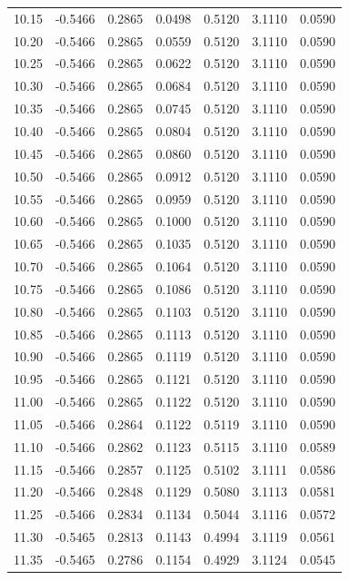\begin{longtable}{|c|c|c|c|c|c|c|}
10.15 & -0.5466 & 0.2865 & 0.0498 & 0.5120 & 3.1110 & 0.0590 \\
10.20 & -0.5466 & 0.2865 & 0.0559 & 0.5120 & 3.1110 & 0.0590 \\
10.25 & -0.5466 & 0.2865 & 0.0622 & 0.5120 & 3.1110 & 0.0590 \\
10.30 & -0.5466 & 0.2865 & 0.0684 & 0.5120 & 3.1110 & 0.0590 \\
10.35 & -0.5466 & 0.2865 & 0.0745 & 0.5120 & 3.1110 & 0.0590 \\
10.40 & -0.5466 & 0.2865 & 0.0804 & 0.5120 & 3.1110 & 0.0590 \\
10.45 & -0.5466 & 0.2865 & 0.0860 & 0.5120 & 3.1110 & 0.0590 \\
10.50 & -0.5466 & 0.2865 & 0.0912 & 0.5120 & 3.1110 & 0.0590 \\
10.55 & -0.5466 & 0.2865 & 0.0959 & 0.5120 & 3.1110 & 0.0590 \\
10.60 & -0.5466 & 0.2865 & 0.1000 & 0.5120 & 3.1110 & 0.0590 \\
10.65 & -0.5466 & 0.2865 & 0.1035 & 0.5120 & 3.1110 & 0.0590 \\
10.70 & -0.5466 & 0.2865 & 0.1064 & 0.5120 & 3.1110 & 0.0590 \\
10.75 & -0.5466 & 0.2865 & 0.1086 & 0.5120 & 3.1110 & 0.0590 \\
10.80 & -0.5466 & 0.2865 & 0.1103 & 0.5120 & 3.1110 & 0.0590 \\
10.85 & -0.5466 & 0.2865 & 0.1113 & 0.5120 & 3.1110 & 0.0590 \\
10.90 & -0.5466 & 0.2865 & 0.1119 & 0.5120 & 3.1110 & 0.0590 \\
10.95 & -0.5466 & 0.2865 & 0.1121 & 0.5120 & 3.1110 & 0.0590 \\
11.00 & -0.5466 & 0.2865 & 0.1122 & 0.5120 & 3.1110 & 0.0590 \\
11.05 & -0.5466 & 0.2864 & 0.1122 & 0.5119 & 3.1110 & 0.0590 \\
11.10 & -0.5466 & 0.2862 & 0.1123 & 0.5115 & 3.1110 & 0.0589 \\
11.15 & -0.5466 & 0.2857 & 0.1125 & 0.5102 & 3.1111 & 0.0586 \\
11.20 & -0.5466 & 0.2848 & 0.1129 & 0.5080 & 3.1113 & 0.0581 \\
11.25 & -0.5466 & 0.2834 & 0.1134 & 0.5044 & 3.1116 & 0.0572 \\
11.30 & -0.5465 & 0.2813 & 0.1143 & 0.4994 & 3.1119 & 0.0561 \\
11.35 & -0.5465 & 0.2786 & 0.1154 & 0.4929 & 3.1124 & 0.0545 \\

\end{longtable}
